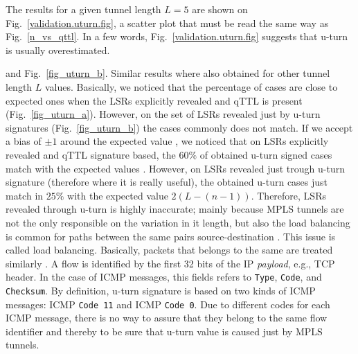 The results for a given tunnel length $L=5$ are shown on
Fig.~\ref{validation.uturn.fig}, a scatter plot that must be read the same way
as Fig.~\ref{n_vs_qttl}.  In a few words, Fig.~\ref{validation.uturn.fig}
suggests that u-turn is usually overestimated.  


 and Fig.~\ref{fig_uturn_b}. Similar results
where also obtained for other tunnel length $L$ values. Basically, we noticed
that the percentage of cases  are close to expected ones when
the LSRs explicitly revealed  and qTTL is present
(Fig.~\ref{fig_uturn_a}). However, on the set of LSRs revealed just by u-turn
signatures (Fig.~\ref{fig_uturn_b}) the cases 
commonly does not match. If we accept a bias of $ \pm 1$ around the expected
value , we noticed that on LSRs explicitly revealed and qTTL
signature based, the $60\%$ of obtained u-turn signed cases match with the
expected values . However, on LSRs revealed just trough
u-turn signature (therefore where it is really useful), the obtained u-turn
cases just match in $25\%$ with the expected value $2(L-(n-1))$.
Therefore, LSRs revealed  through u-turn is highly inaccurate; mainly
because MPLS tunnels are not the only responsible on the variation in it length,
but also the load balancing is common for paths between the same pairs
source-destination \cite{BRICE07}. This issue is called  load
balancing. Basically, packets that belongs to the same  are treated
similarly \cite{BRICE06}. A flow is identified by the first 32 bits of the IP
\textit{payload}, e.g., TCP header. In the case of ICMP messages, this fields
refers to \texttt{Type}, \texttt{Code}, and \texttt{Checksum}.
By definition, u-turn signature is based on two kinds of ICMP messages:
ICMP \echoreply \texttt{Code 11} and ICMP \ttlexceeded \texttt{Code 0}.
Due to different codes for each ICMP message, there is no way to assure that
they belong to the same flow identifier and thereby to be sure that u-turn value
is caused just by MPLS tunnels.  
